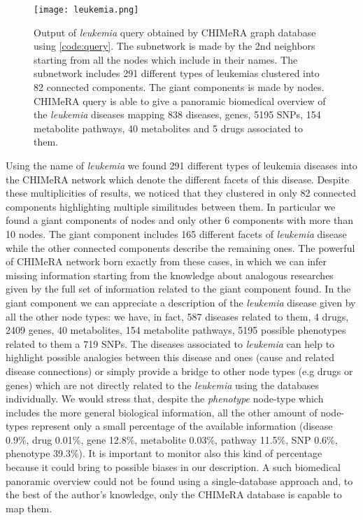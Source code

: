 \documentclass{standalone}
\begin{document}
\begin{figure}[htbp]
\centering
\texttt{[image: leukemia.png]}
\caption{Output of \emph{leukemia} query obtained by \textsf{CHIMeRA} graph database using \ref{code:query}.
The subnetwork is made by the 2nd neighbors starting from all the nodes which include  in their names.
The subnetwork includes 291 different types of leukemias clustered into 82 connected components.
The giant components is made by  nodes.
\textsf{CHIMeRA} query is able to give a panoramic biomedical overview of the \emph{leukemia} diseases mapping 838 diseases,  genes, 5195 SNPs, 154 metabolite pathways, 40 metabolites and 5 drugs associated to them.
}
\label{fig:leukemia}
\end{figure}

Using the  name of \emph{leukemia} we found 291 different types of leukemia diseases into the \textsf{CHIMeRA} network which denote the different facets of this disease.
Despite these multiplicities of results, we noticed that they clustered in only 82 connected components highlighting multiple similitudes between them.
In particular we found a giant components of  nodes and only other 6 components with more than 10 nodes.
The giant component includes 165 different facets of \emph{leukemia} disease while the other connected components describe the remaining ones.
The powerful of \textsf{CHIMeRA} network born exactly from these cases, in which we can infer missing information starting from the knowledge about analogous researches given by the full set of information related to the giant component found.
In the giant component we can appreciate a description of the \emph{leukemia} disease given by all the other node types: we have, in fact, 587 diseases related to them, 4 drugs, 2409 genes, 40 metabolites, 154 metabolite pathways, 5195 possible phenotypes related to them a 719 SNPs.
The diseases associated to \emph{leukemia} can help to highlight possible analogies between this  disease and  ones (cause and related disease connections) or simply provide a bridge to other node types (e.g drugs or genes) which are not directly related to the \emph{leukemia} using the databases individually.
We would stress that, despite the \emph{phenotype} node-type which includes the more general biological information, all the other amount of node-types represent only a small percentage of the available information (disease 0.9\%, drug 0.01\%, gene 12.8\%, metabolite 0.03\%, pathway 11.5\%, SNP 0.6\%, phenotype 39.3\%).
It is important to monitor also this kind of percentage because it could bring to possible biases in our description.
A such biomedical panoramic overview could not be found using a single-database approach and, to the best of the author's knowledge, only the \textsf{CHIMeRA} database is capable to map them.
\end{document}
